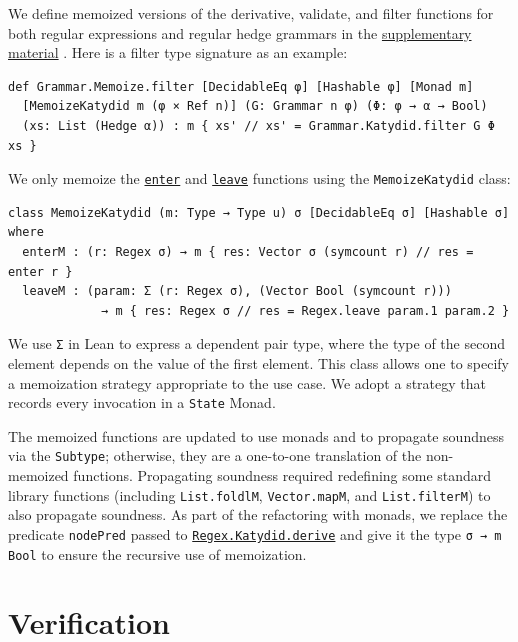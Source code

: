 \documentclass[acmsmall,%
  screen,%
  authorversion, %
  nonacm%
]{acmart}
\newcommand{\link}[2]{\mbox{\hyperref[#2]{\lstinline{#1}}}\xspace}
\newcommand{\RegexKatydidDerive}{\link{Regex.Katydid.derive}{def Regex.Katydid.derive}}
\newcommand{\enter}{\link{enter}{def enter}}
\newcommand{\leave}{\link{leave}{def leave}}
\newcommand{\supplementarymaterial}{%
  \hyperref[supplementary_material]{supplementary material}\xspace%
}
\begin{document}
We define memoized versions of the derivative, validate, and filter functions for both regular expressions and regular hedge grammars in the \supplementarymaterial.
Here is a filter type signature as an example:
\begin{lstlisting}[label=def Grammar.Memoize.filter]
def Grammar.Memoize.filter [DecidableEq φ] [Hashable φ] [Monad m]
  [MemoizeKatydid m (φ × Ref n)] (G: Grammar n φ) (Φ: φ → α → Bool)
  (xs: List (Hedge α)) : m { xs' // xs' = Grammar.Katydid.filter G Φ xs }
\end{lstlisting}
We only memoize the \enter and \leave functions using the \lstinline{MemoizeKatydid} class:
\begin{lstlisting}[label=MemoizeKatydid]
class MemoizeKatydid (m: Type → Type u) σ [DecidableEq σ] [Hashable σ] where
  enterM : (r: Regex σ) → m { res: Vector σ (symcount r) // res = enter r }
  leaveM : (param: Σ (r: Regex σ), (Vector Bool (symcount r)))
             → m { res: Regex σ // res = Regex.leave param.1 param.2 }
\end{lstlisting}
We use \lstinline{Σ} in Lean to express a dependent pair type, where the type of the second element depends on the value of the first element.
This class allows one to specify a memoization strategy appropriate to the use case.
We adopt a strategy that records every invocation in a \lstinline{State} Monad.

The memoized functions are updated to use monads and to propagate soundness via the \lstinline{Subtype}; otherwise, they are a one-to-one translation of the non-memoized functions.
Propagating soundness required redefining some standard library functions (including \lstinline{List.foldlM}, \lstinline{Vector.mapM}, and \lstinline{List.filterM}) to also propagate soundness.
As part of the refactoring with monads, we replace the predicate \lstinline{nodePred} passed to \RegexKatydidDerive and give it the type \lstinline{σ → m Bool} to ensure the recursive use of memoization.

\section{Verification}
\label{section_verification}
\end{document}
